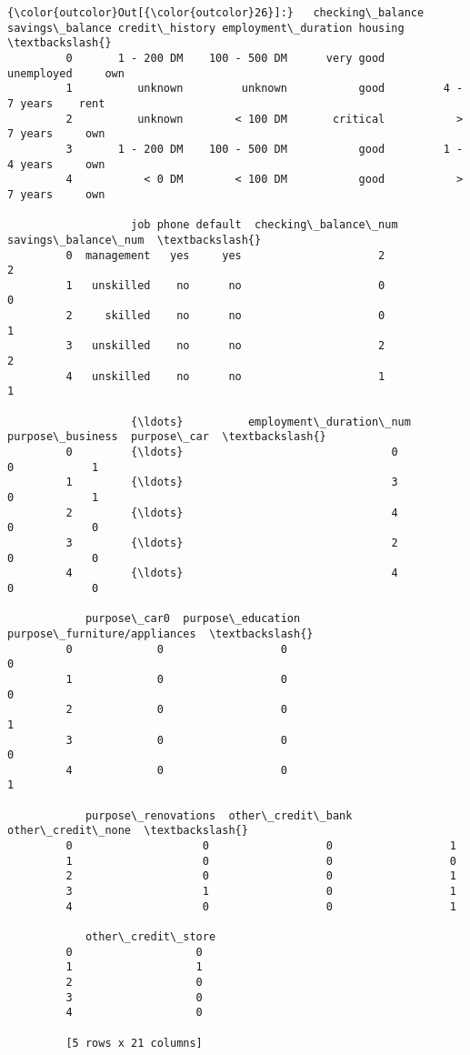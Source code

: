\documentclass[11pt]{article}
\begin{document}
\begin{Verbatim}[commandchars=\\\{\}]
{\color{outcolor}Out[{\color{outcolor}26}]:}   checking\_balance savings\_balance credit\_history employment\_duration housing  \textbackslash{}
         0       1 - 200 DM    100 - 500 DM      very good          unemployed     own   
         1          unknown         unknown           good         4 - 7 years    rent   
         2          unknown        < 100 DM       critical           > 7 years     own   
         3       1 - 200 DM    100 - 500 DM           good         1 - 4 years     own   
         4           < 0 DM        < 100 DM           good           > 7 years     own   
         
                   job phone default  checking\_balance\_num  savings\_balance\_num  \textbackslash{}
         0  management   yes     yes                     2                    2   
         1   unskilled    no      no                     0                    0   
         2     skilled    no      no                     0                    1   
         3   unskilled    no      no                     2                    2   
         4   unskilled    no      no                     1                    1   
         
                   {\ldots}          employment\_duration\_num  purpose\_business  purpose\_car  \textbackslash{}
         0         {\ldots}                                0                 0            1   
         1         {\ldots}                                3                 0            1   
         2         {\ldots}                                4                 0            0   
         3         {\ldots}                                2                 0            0   
         4         {\ldots}                                4                 0            0   
         
            purpose\_car0  purpose\_education  purpose\_furniture/appliances  \textbackslash{}
         0             0                  0                             0   
         1             0                  0                             0   
         2             0                  0                             1   
         3             0                  0                             0   
         4             0                  0                             1   
         
            purpose\_renovations  other\_credit\_bank  other\_credit\_none  \textbackslash{}
         0                    0                  0                  1   
         1                    0                  0                  0   
         2                    0                  0                  1   
         3                    1                  0                  1   
         4                    0                  0                  1   
         
            other\_credit\_store  
         0                   0  
         1                   1  
         2                   0  
         3                   0  
         4                   0  
         
         [5 rows x 21 columns]
\end{Verbatim}
            
\end{document}
